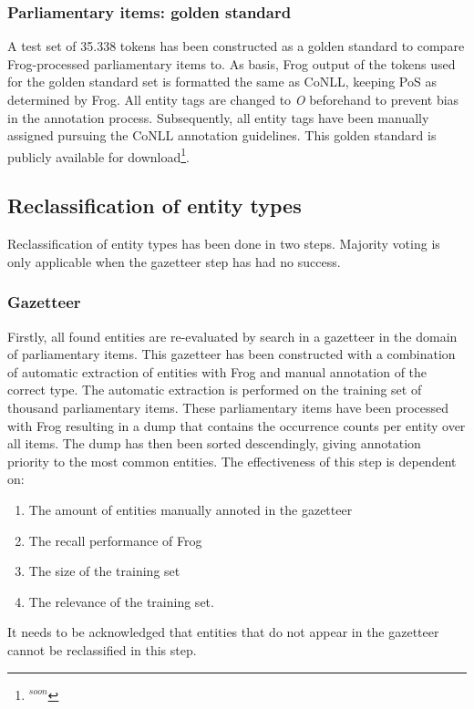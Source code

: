 \subsubsection{Parliamentary items: golden standard}
A test set of 35.338 tokens has been constructed as a golden standard to compare Frog-processed parliamentary items to. As basis, Frog output of the tokens used for the golden standard set is formatted the same as CoNLL, keeping PoS as determined by Frog. All entity tags are changed to \textit{O} beforehand to prevent bias in the annotation process. Subsequently, all entity tags have been manually assigned pursuing the CoNLL annotation guidelines. This golden standard is publicly available for download\footnote{$^{soon}$}. 

\subsection{Reclassification of entity types}\label{subsec:reclas}
Reclassification of entity types has been done in two steps. Majority voting is only applicable when the gazetteer step has had no success.
\subsubsection{Gazetteer}
Firstly, all found entities are re-evaluated by search in a gazetteer in the domain of parliamentary items. This gazetteer has been constructed with a combination of automatic extraction of entities with Frog and manual annotation of the correct type. The automatic extraction is performed on the training set of thousand parliamentary items. These parliamentary items have been processed with Frog resulting in a dump that contains the occurrence counts per entity over all items. The dump has then been sorted descendingly, giving annotation priority to the most common entities. The effectiveness of this step is dependent on: 
\begin{enumerate} 
\item The amount of entities manually annoted in the gazetteer
\item The recall performance of Frog 
\item The size of the training set 
\item The relevance of the training set. 
\end{enumerate}
It needs to be acknowledged that entities that do not appear in the gazetteer cannot be reclassified in this step.


